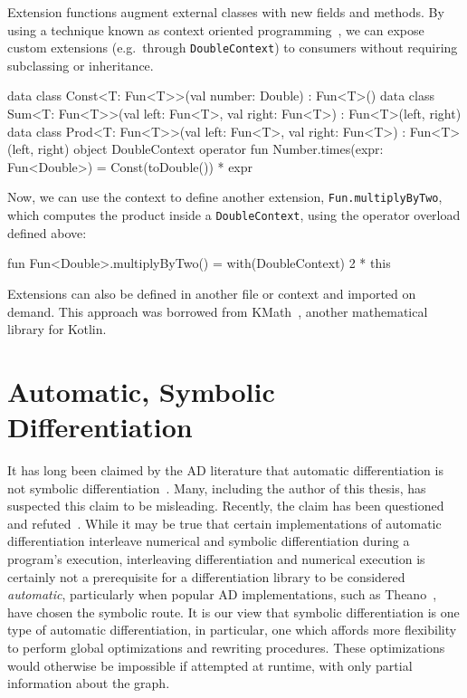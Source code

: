 \documentclass[12pt,initial,twoside,maitrise]{dms}
\def\inline{\lstinline[basicstyle=\ttfamily]}
\numberwithin{equation}{section}
\numberwithin{table}{chapter}
\numberwithin{figure}{chapter}
\begin{document}
Extension functions augment external classes with new fields and methods. By using a technique known as context oriented programming~\citep{hirschfeld2008context}, we can expose custom extensions (e.g.\ through \inline{DoubleContext}) to consumers without requiring subclassing or inheritance.
%
\begin{mylisting}[caption={We can provide numerical extensions, wrapped in a context.}, language=Kotlin]
data class Const<T: Fun<T>>(val number: Double) : Fun<T>()
data class Sum<T: Fun<T>>(val left: Fun<T>, val right: Fun<T>) : Fun<T>(left, right)
data class Prod<T: Fun<T>>(val left: Fun<T>, val right: Fun<T>) : Fun<T>(left, right)
object DoubleContext {
    operator fun Number.times(expr: Fun<Double>) = Const(toDouble()) * expr
}
\end{mylisting}
%
Now, we can use the context to define another extension, \inline{Fun.multiplyByTwo}, which computes the product inside a \inline{DoubleContext}, using the operator overload defined above:
%
\begin{mylisting}
fun Fun<Double>.multiplyByTwo() = with(DoubleContext) { 2 * this }
\end{mylisting}
%
Extensions can also be defined in another file or context and imported on demand. This approach was borrowed from KMath~\citep{nozik2019acat}, another mathematical library for Kotlin.

\section{Automatic, Symbolic Differentiation}

It has long been claimed by the AD literature that automatic differentiation is not symbolic differentiation~\citep{baydin-survey}. Many, including the author of this thesis, has suspected this claim to be misleading. Recently, the claim has been questioned~\citep{wang2018demystifying} and refuted~\citep{laue2019equivalence}. While it may be true that certain implementations of automatic differentiation interleave numerical and symbolic differentiation during a program's execution, interleaving differentiation and numerical execution is certainly not a prerequisite for a differentiation library to be considered \textit{automatic}, particularly when popular AD implementations, such as Theano~\citep{theano}, have chosen the symbolic route. It is our view that symbolic differentiation is one type of automatic differentiation, in particular, one which affords more flexibility to perform global optimizations and rewriting procedures. These optimizations would otherwise be impossible if attempted at runtime, with only partial information about the graph.
\end{document}
